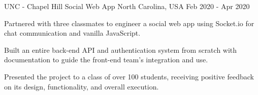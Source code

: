 \begin{cventries}
  \cventry
    {UNC - Chapel Hill} %
    {Social Web App} %
    {North Carolina, USA} %
    {Feb 2020 - Apr 2020} %
    {
      \begin{cvitems} %
        \item {Partnered with three classmates to engineer a social web app using Socket.io for chat communication and vanilla JavaScript.}
        \item {Built an entire back-end API and authentication system from scratch with documentation to guide the front-end team's integration and use.}
        \item {Presented the project to a class of over 100 students, receiving positive feedback on its design, functionality, and overall execution.}
      \end{cvitems}
    }





\end{cventries}
